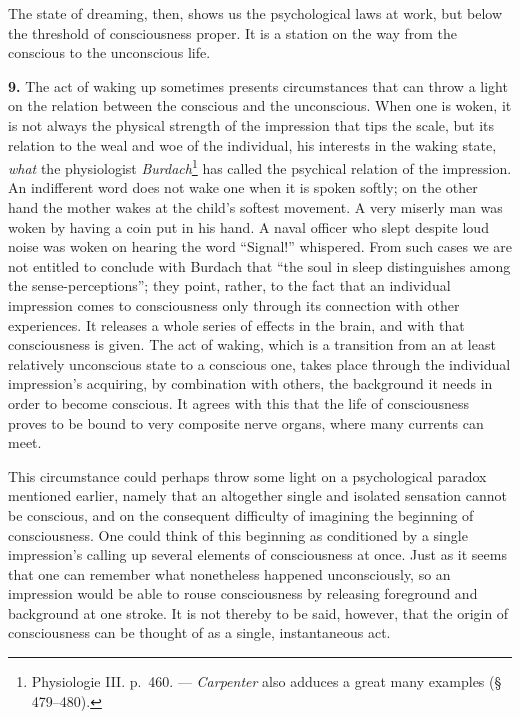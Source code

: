 \documentclass[12pt,a4paper]{book}
\newcommand{\opage}[1]{\marginnote{\footnotesize\textit{[#1]}}}
\begin{document}
The state of dreaming, then, shows us the psychological laws at work, but
below the threshold of consciousness proper. It is a station on the way
from the conscious to the unconscious life.

\textbf{9.} The act of waking up sometimes presents circumstances that
can throw a light on the relation between the conscious and the
unconscious. When one is woken, it is not always the physical strength of
the impression that tips the scale, but its relation to the weal and woe
of the individual, his interests in the waking state, \emph{what} the
physiologist
\emph{Burdach}\footnote{Physiologie III. p.~460. --- \emph{Carpenter} also
adduces a great many examples (§ 479--480).} has called the psychical
relation of the impression. An indifferent word does not wake one when it
is spoken softly; on the other hand the mother wakes at the child's
softest movement. A very miserly man was woken by having a coin put in
his hand. A naval officer who slept despite loud noise was woken on
hearing the word ``Signal!'' whispered. From such cases we are not
entitled to conclude with Burdach that ``the soul in sleep distinguishes
among the sense-perceptions''; they point, rather, to the fact that an
individual impression comes to consciousness only through its connection
with other experiences. It releases a whole series of effects in the
brain, and with that consciousness is given. The act of waking, which is
a transition from an at least relatively unconscious state to a conscious
one, takes place through the individual impression's acquiring, by
combination with others, the background it needs in order to become
conscious. It agrees with this that the life of consciousness proves to
be bound to very composite nerve organs, where many currents can meet.


\opage{96}This circumstance could perhaps throw some light on a
psychological paradox mentioned earlier, namely that an altogether single
and isolated sensation cannot be conscious, and on the consequent
difficulty of imagining the beginning of consciousness. One could think
of this beginning as conditioned by a single impression's calling up
several elements of consciousness at once. Just as it seems that one can
remember what nonetheless happened unconsciously, so an impression would
be able to rouse consciousness by releasing foreground and background at
one stroke. It is not thereby to be said, however, that the origin of
consciousness can be thought of as a single, instantaneous act.
\end{document}
